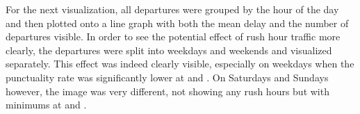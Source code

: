 For the next visualization, all departures were grouped by the hour of the day and then plotted onto a line graph with both the mean delay and the number of departures visible. In order to see the potential effect of rush hour traffic more clearly, the departures were split into weekdays and weekends and visualized separately. This effect was indeed clearly visible, especially on weekdays when the punctuality rate was significantly lower at  and . On Saturdays and Sundays however, the image was very different, not showing any rush hours but with minimums at  and .